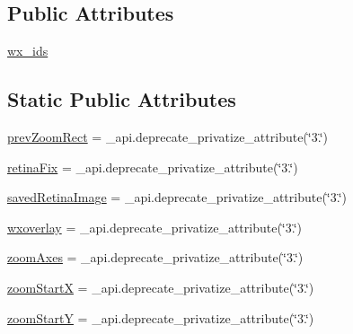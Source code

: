 \subsection*{Public Attributes}
\begin{DoxyCompactItemize}
\item 
\hyperlink{classmatplotlib_1_1backends_1_1backend__wx_1_1NavigationToolbar2Wx_a48c2bad43dc7a3635807b5eb9c73eb50}{wx\+\_\+ids}
\end{DoxyCompactItemize}
\subsection*{Static Public Attributes}
\begin{DoxyCompactItemize}
\item 
\hyperlink{classmatplotlib_1_1backends_1_1backend__wx_1_1NavigationToolbar2Wx_af249df7687dfff980e2001561c7a240a}{prev\+Zoom\+Rect} = \+\_\+api.\+deprecate\+\_\+privatize\+\_\+attribute(\char`\"{}3.\char`\"{})
\item 
\hyperlink{classmatplotlib_1_1backends_1_1backend__wx_1_1NavigationToolbar2Wx_adec2d55812a7e4fa5e405b9ef3f3bf45}{retina\+Fix} = \+\_\+api.\+deprecate\+\_\+privatize\+\_\+attribute(\char`\"{}3.\char`\"{})
\item 
\hyperlink{classmatplotlib_1_1backends_1_1backend__wx_1_1NavigationToolbar2Wx_a31ea840088743e60250bbd0c69f664c6}{saved\+Retina\+Image} = \+\_\+api.\+deprecate\+\_\+privatize\+\_\+attribute(\char`\"{}3.\char`\"{})
\item 
\hyperlink{classmatplotlib_1_1backends_1_1backend__wx_1_1NavigationToolbar2Wx_a6c83d28051df5de99abe4ad47893cd32}{wxoverlay} = \+\_\+api.\+deprecate\+\_\+privatize\+\_\+attribute(\char`\"{}3.\char`\"{})
\item 
\hyperlink{classmatplotlib_1_1backends_1_1backend__wx_1_1NavigationToolbar2Wx_a39181c8800200daa74c2b1ae85a57ee4}{zoom\+Axes} = \+\_\+api.\+deprecate\+\_\+privatize\+\_\+attribute(\char`\"{}3.\char`\"{})
\item 
\hyperlink{classmatplotlib_1_1backends_1_1backend__wx_1_1NavigationToolbar2Wx_a59d9c0c0b6cc1eab94c17cf44c6131f0}{zoom\+StartX} = \+\_\+api.\+deprecate\+\_\+privatize\+\_\+attribute(\char`\"{}3.\char`\"{})
\item 
\hyperlink{classmatplotlib_1_1backends_1_1backend__wx_1_1NavigationToolbar2Wx_a38814b81fd2f5fda5238867dd5732523}{zoom\+StartY} = \+\_\+api.\+deprecate\+\_\+privatize\+\_\+attribute(\char`\"{}3.\char`\"{})
\end{DoxyCompactItemize}


